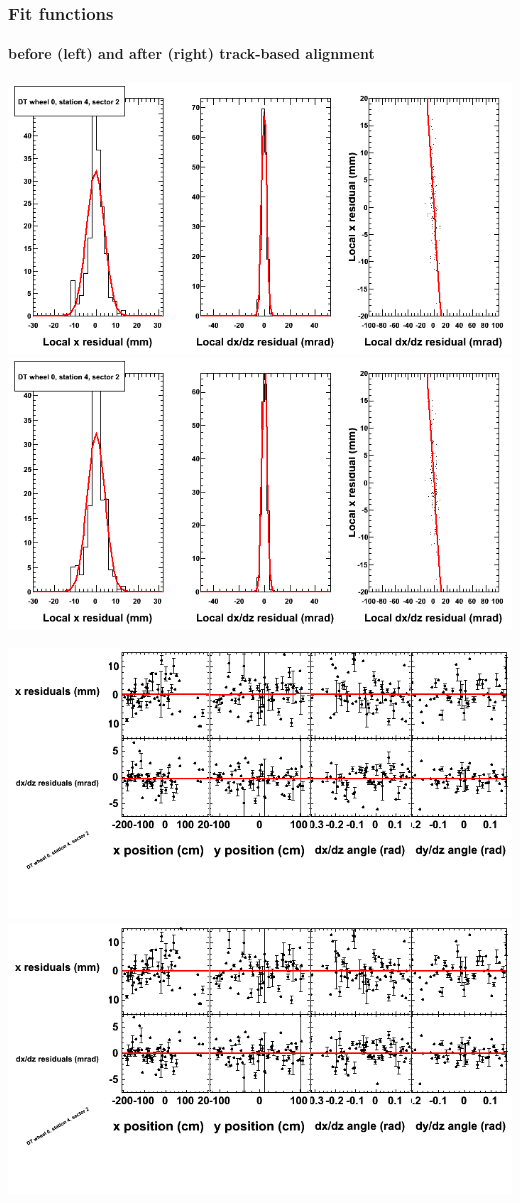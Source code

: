 \documentclass[compress]{beamer}
\begin{document}
\begin{frame}
\frametitle{Fit functions}
\framesubtitle{before (left) and after (right) track-based alignment}
\includegraphics[width=0.5\linewidth]{fitfunctions_re01/MBwhCst4sec02_bellcurves.png} \includegraphics[width=0.5\linewidth]{fitfunctions_re05/MBwhCst4sec02_bellcurves.png}

\includegraphics[width=0.5\linewidth]{fitfunctions_re01/MBwhCst4sec02_polynomials.png} \includegraphics[width=0.5\linewidth]{fitfunctions_re05/MBwhCst4sec02_polynomials.png}
\end{frame}
\end{document}
